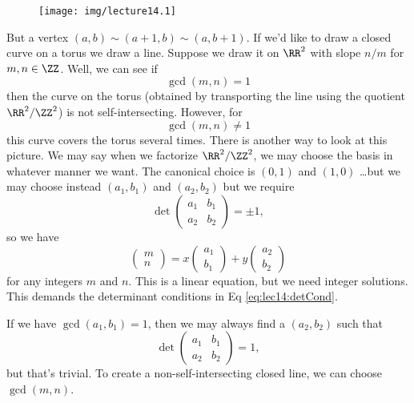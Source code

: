 \begin{wrapfigure}{l}{5pc}
  \centering
  \texttt{[image: img/lecture14.1]}
\end{wrapfigure}
\noindent But a vertex $(a,b)\sim(a+1,b)\sim(a,b+1)$. If we'd like to draw
a closed curve on a torus we draw a line. Suppose we draw it on
$\RR^2$ with slope $n/m$ for $m,n\in\ZZ$. Well, we can see if
\begin{equation}
\gcd(m,n)=1
\end{equation}
then the curve on the torus (obtained by transporting the line
using the quotient $\RR^2/\ZZ^2$) is not
self-intersecting. However, for 
\begin{equation}
\gcd(m,n)\not=1
\end{equation}
this curve covers the torus several times. There is another way
to look at this picture. We may say when we factorize
$\RR^2/\ZZ^2$, we may choose the basis in whatever manner we want.
The canonical choice is $(0,1)$ and $(1,0)$ \dots but we may
choose instead $(a_1,b_1)$ and $(a_2,b_2)$ but we require
\begin{equation}\label{eq:lec14:detCond}
\det\begin{pmatrix}
a_1 & b_1\\
a_2 & b_2
\end{pmatrix}=\pm1,
\end{equation}
so we have
\begin{equation}
\begin{pmatrix}m\\n
\end{pmatrix}=x\begin{pmatrix}a_1\\b_1
\end{pmatrix}+y\begin{pmatrix}a_2\\b_2
\end{pmatrix}
\end{equation}
for any integers $m$ and $n$. This is a linear equation, but we
need integer solutions. This demands the determinant conditions
in Eq \eqref{eq:lec14:detCond}.

If we have $\gcd(a_1,b_1)=1$, then we may always find a
$(a_2,b_2)$ such that
\begin{equation}
\det\begin{pmatrix}
a_1 & b_1\\
a_2 & b_2
\end{pmatrix}=1,
\end{equation}
but that's trivial. To create a non-self-intersecting closed
line, we can choose $\gcd(m,n)$.

